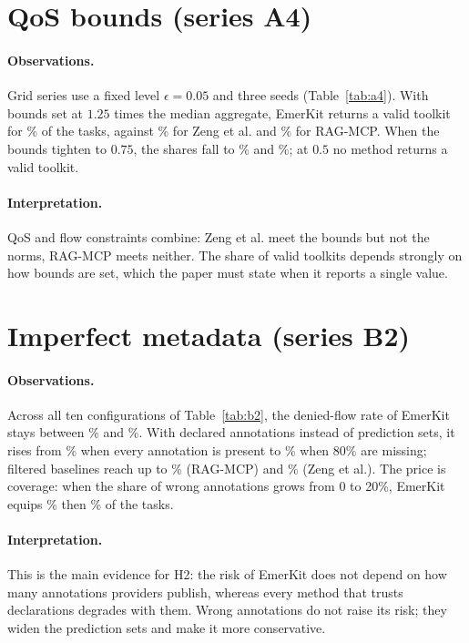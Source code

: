 \documentclass[10pt]{article}
\begin{document}
\section{QoS bounds (series A4)}
\paragraph{Observations.} Grid series use a fixed level $\epsilon=0.05$ and three seeds (Table~\ref{tab:a4}). With bounds set at $1.25$ times the median aggregate, EmerKit returns a valid toolkit for \RAfourEmk\% of the tasks, against \RAfourZeng\% for Zeng et al. and \RAfourRag\% for RAG-MCP. When the bounds tighten to $0.75$, the shares fall to \RAfourEmkSevenFive\% and \RAfourZengSevenFive\%; at $0.5$ no method returns a valid toolkit.
\paragraph{Interpretation.} QoS and flow constraints combine: Zeng et al. meet the bounds but not the norms, RAG-MCP meets neither. The share of valid toolkits depends strongly on how bounds are set, which the paper must state when it reports a single value.

\section{Imperfect metadata (series B2)}
\paragraph{Observations.} Across all ten configurations of Table~\ref{tab:b2}, the denied-flow rate of EmerKit stays between \RBtwoEmkMin\% and \RBtwoEmkMax\%. With declared annotations instead of prediction sets, it rises from \RBtwoDeclMzero\% when every annotation is present to \RBtwoDeclMeight\% when 80\% are missing; filtered baselines reach up to \RBtwoRagMax\% (RAG-MCP) and \RBtwoZengMax\% (Zeng et al.). The price is coverage: when the share of wrong annotations grows from 0 to 20\%, EmerKit equips \RBtwoEqWzero\% then \RBtwoEqWtwenty\% of the tasks.
\paragraph{Interpretation.} This is the main evidence for H2: the risk of EmerKit does not depend on how many annotations providers publish, whereas every method that trusts declarations degrades with them. Wrong annotations do not raise its risk; they widen the prediction sets and make it more conservative.
\end{document}
